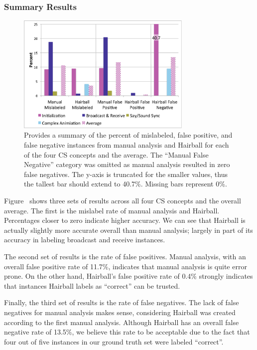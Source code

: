 \subsubsection{Summary Results}
\begin{figure}[!t]
\centering \includegraphics[trim=.3in .15in .3in .15in, clip,
  width=3.3in]{graphs/AutoSummary.eps}
\caption{Provides a summary of the percent of mislabeled, false positive, and
  false negative instances from manual analysis and Hairball for each of the
  four CS concepts and the average. The ``Manual False Negative'' category was
  omitted as manual analysis resulted in zero false negatives. The y-axis is
  truncated for the smaller values, thus the tallest bar should extend to
  40.7\%. Missing bars represent 0\%.}
\end{figure}

Figure~ shows three sets of results across all four CS
concepts and the overall average. The first is the mislabel rate of manual
analysis and Hairball. Percentages closer to zero indicate higher accuracy. We
can see that Hairball is actually slightly more accurate overall than manual
analysis; largely in part of its accuracy in labeling broadcast and receive
instances.

The second set of results is the rate of false positives. Manual analysis, with
an overall false positive rate of 11.7\%, indicates that manual analysis is
quite error prone. On the other hand, Hairball's false positive rate of 0.4\%
strongly indicates that instances Hairball labels as ``correct'' can be
trusted.

Finally, the third set of results is the rate of false negatives. The lack of
false negatives for manual analysis makes sense, considering Hairball was
created according to the first manual analysis. Although Hairball has an
overall false negative rate of 13.5\%, we believe this rate to be acceptable
due to the fact that four out of five instances in our ground truth set were
labeled ``correct''.
